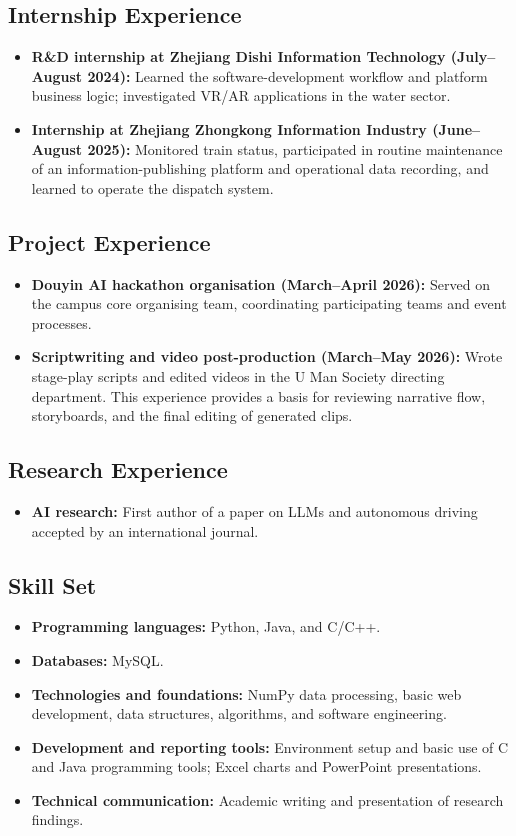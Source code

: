 \documentclass[a4paper,12pt]{article}
\begin{document}
\subsection*{Internship Experience}
\begin{itemize}
  \item \textbf{R\&D internship at Zhejiang Dishi Information Technology (July--August 2024):} Learned the software-development workflow and platform business logic; investigated VR/AR applications in the water sector.
  \item \textbf{Internship at Zhejiang Zhongkong Information Industry (June--August 2025):} Monitored train status, participated in routine maintenance of an information-publishing platform and operational data recording, and learned to operate the dispatch system.
\end{itemize}

\subsection*{Project Experience}
\begin{itemize}
  \item \textbf{Douyin AI hackathon organisation (March--April 2026):} Served on the campus core organising team, coordinating participating teams and event processes.
  \item \textbf{Scriptwriting and video post-production (March--May 2026):} Wrote stage-play scripts and edited videos in the U Man Society directing department. This experience provides a basis for reviewing narrative flow, storyboards, and the final editing of generated clips.
\end{itemize}

\subsection*{Research Experience}
\begin{itemize}
  \item \textbf{AI research:} First author of a paper on LLMs and autonomous driving accepted by an international journal.
\end{itemize}

\subsection*{Skill Set}
\begin{itemize}
  \item \textbf{Programming languages:} Python, Java, and C/C++.
  \item \textbf{Databases:} MySQL.
  \item \textbf{Technologies and foundations:} NumPy data processing, basic web development, data structures, algorithms, and software engineering.
  \item \textbf{Development and reporting tools:} Environment setup and basic use of C and Java programming tools; Excel charts and PowerPoint presentations.
  \item \textbf{Technical communication:} Academic writing and presentation of research findings.
\end{itemize}
\end{document}

